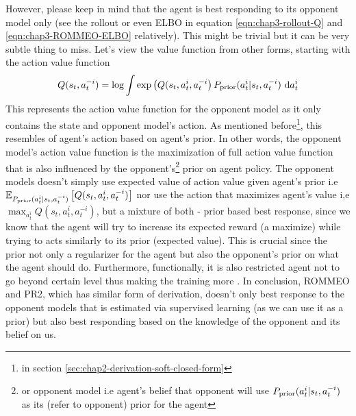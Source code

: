 However, please keep in mind that the agent is best responding to its opponent model only (see the rollout or even ELBO in equation \ref{eqn:chap3-rollout-Q} and \ref{eqn:chap3-ROMMEO-ELBO} relatively). This might be trivial but it can be very subtle thing to miss. 
Let's view the value function from other forms, starting with the action value function 
\begin{equation}
    Q(s_t, a^{-i}_t) = \log \int \exp \left( Q(s_t, a^i_t, a^{-i}_t \right)P_{\text{prior}}(a^i_t | s_t, a^{-i}_t)  \ \mathrm{d} a^i_t 
\end{equation}
This represents the action value function for the opponent model as it only contains the state and opponent model's action. As mentioned before\footnote{in section \ref{sec:chap2-derivation-soft-closed-form}}, this resembles  of agent's action based on agent's prior. In other words, the opponent model's action value function is the maximization of full action value function that is also influenced by the opponent's\footnote{or opponent model i.e agent's belief that opponent will use $P_{\text{prior}} (a^i_t | s_t, a^{-i}_t)$ as its (refer to opponent) prior for the agent} prior on agent policy. The opponent models doesn't simply use expected value of action value given agent's prior i.e $\mathbb{E}_{P_{\text{prior}} (a^i_t | s_t, a^{-i}_t)}\left[ Q(s_t, a^i_t, a^{-i}_t) \right]$ nor use the action that maximizes agent's value i,e $\max_{a^i_t} Q(s_t, a^i_t, a^{-i}_t)$, but a mixture of both - prior based best response, since we know that the agent will try to increase its expected reward (a maximize) while trying to acts similarly to its prior (expected value). This is crucial since the prior not only a regularizer for the agent but also the opponent's prior on what the agent should do. Furthermore, functionally, it is also restricted agent not to go beyond certain level thus making the training more . In conclusion, ROMMEO and PR2, which has similar form of derivation, doesn't only best response to the opponent models that is estimated via supervised learning (as we can use it as a prior) but also best responding based on the knowledge of the opponent and its belief on us.

